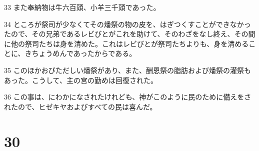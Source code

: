 \par 33 また奉納物は牛六百頭、小羊三千頭であった。
\par 34 ところが祭司が少なくてその燔祭の物の皮を、はぎつくすことができなかったので、その兄弟であるレビびとがこれを助けて、そのわざをなし終え、その間に他の祭司たちは身を清めた。これはレビびとが祭司たちよりも、身を清めることに、きちょうめんであったからである。
\par 35 このほかおびただしい燔祭があり、また、酬恩祭の脂肪および燔祭の灌祭もあった。こうして、主の宮の勤めは回復された。
\par 36 この事は、にわかになされたけれども、神がこのように民のために備えをされたので、ヒゼキヤおよびすべての民は喜んだ。

\chapter{30}

